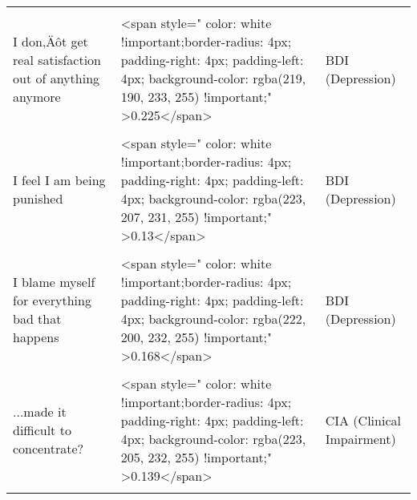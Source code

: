 \documentclass[border=1mm]{standalone}
\begin{document}
\begin{longtable}{lll}
\cellcolor{gray!10}{I feel like a failure} & \cellcolor{gray!10}{<span style="     color: white !important;border-radius: 4px; padding-right: 4px; padding-left: 4px; background-color: rgba(218, 189, 233, 255) !important;" >0.235</span>} & \cellcolor{gray!10}{BDI (Depression)}\\
\addlinespace
I don‚Äôt get real satisfaction out of anything anymore & <span style="     color: white !important;border-radius: 4px; padding-right: 4px; padding-left: 4px; background-color: rgba(219, 190, 233, 255) !important;" >0.225</span> & BDI (Depression)\\
\cellcolor{gray!10}{I feel guilty all the time} & \cellcolor{gray!10}{<span style="     color: white !important;border-radius: 4px; padding-right: 4px; padding-left: 4px; background-color: rgba(213, 173, 234, 255) !important;" >0.325</span>} & \cellcolor{gray!10}{BDI (Depression)}\\
I feel I am being punished & <span style="     color: white !important;border-radius: 4px; padding-right: 4px; padding-left: 4px; background-color: rgba(223, 207, 231, 255) !important;" >0.13</span> & BDI (Depression)\\
\cellcolor{gray!10}{I hate myself} & \cellcolor{gray!10}{<span style="     color: white !important;border-radius: 4px; padding-right: 4px; padding-left: 4px; background-color: rgba(224, 207, 231, 255) !important;" >0.127</span>} & \cellcolor{gray!10}{BDI (Depression)}\\
I blame myself for everything bad that happens & <span style="     color: white !important;border-radius: 4px; padding-right: 4px; padding-left: 4px; background-color: rgba(222, 200, 232, 255) !important;" >0.168</span> & BDI (Depression)\\
\addlinespace
\cellcolor{gray!10}{I would kill myself if I had the chance} & \cellcolor{gray!10}{<span style="     color: white !important;border-radius: 4px; padding-right: 4px; padding-left: 4px; background-color: rgba(223, 206, 232, 255) !important;" >0.136</span>} & \cellcolor{gray!10}{BDI (Depression)}\\
...made it difficult to concentrate? & <span style="     color: white !important;border-radius: 4px; padding-right: 4px; padding-left: 4px; background-color: rgba(223, 205, 232, 255) !important;" >0.139</span> & CIA (Clinical Impairment)\\
\cellcolor{gray!10}{...made it difficult to eat out with others?} & \cellcolor{gray!10}{<span style="     color: white !important;border-radius: 4px; padding-right: 4px; padding-left: 4px; background-color: rgba(213, 173, 234, 255) !important;" >0.326</span>} & \cellcolor{gray!10}{CIA (Clinical Impairment)}\\

\end{longtable}
\end{document}
